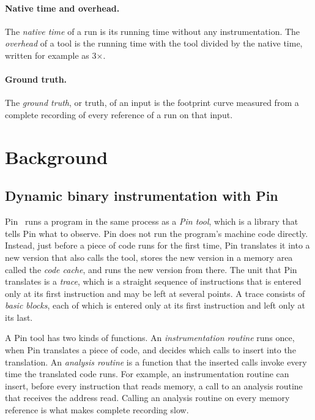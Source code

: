 \documentclass[11pt]{article}
\newcommand{\term}[1]{\emph{#1}}
\begin{document}
\paragraph{Native time and overhead.}
The \term{native time} of a run is its running time without any instrumentation. The \term{overhead} of a tool is the running time with the tool divided by the native time, written for example as 3$\times$.

\paragraph{Ground truth.}
The \term{ground truth}, or truth, of an input is the footprint curve measured from a complete recording of every reference of a run on that input.

\section{Background}
\label{sec:background}

\subsection{Dynamic binary instrumentation with Pin}
\label{sec:pin}

Pin~\cite{Luk2005Pin,pinmanual} runs a program in the same process as a \term{Pin tool}, which is a library that tells Pin what to observe. Pin does not run the program's machine code directly. Instead, just before a piece of code runs for the first time, Pin translates it into a new version that also calls the tool, stores the new version in a memory area called the \term{code cache}, and runs the new version from there. The unit that Pin translates is a \term{trace}, which is a straight sequence of instructions that is entered only at its first instruction and may be left at several points. A trace consists of \term{basic blocks}, each of which is entered only at its first instruction and left only at its last.

A Pin tool has two kinds of functions. An \term{instrumentation routine} runs once, when Pin translates a piece of code, and decides which calls to insert into the translation. An \term{analysis routine} is a function that the inserted calls invoke every time the translated code runs. For example, an instrumentation routine can insert, before every instruction that reads memory, a call to an analysis routine that receives the address read. Calling an analysis routine on every memory reference is what makes complete recording slow.
\end{document}
